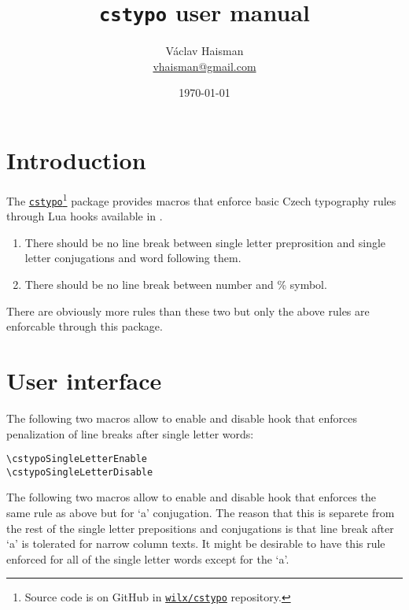 \documentclass[paper=B5,DIV=calc,parskip=half]{scrartcl}
\author{Václav Haisman\texorpdfstring{%
    \\{\small\href{mailto:vhaisman+cstypo@gmail.com?subject=[cstypo]}{vhaisman@gmail.com}}}{}}
\date{\today}
\title{\texttt{cstypo} user manual}
\begin{document}
\begin{titlepage}
  \maketitle  
\end{titlepage}

\tableofcontents

\section{Introduction}
The \href{https://www.ctan.org/pkg/cstypo}{\texttt{cstypo}}\footnote{Source
  code is on GitHub in
  \href{https://github.com/wilx/cstypo}{\texttt{wilx/cstypo}} repository.}
package provides macros that enforce basic Czech typography rules through Lua
hooks available in \LuaTeX{}.

\begin{enumerate}%
\item\label{itm:singleletter} There should be no line break between single
  letter preprosition and single letter conjugations and word following them.
\item\label{itm:percents} There should be no line break between number and \%
  symbol.
\end{enumerate}

There are obviously more rules than these two but only the above rules are
enforcable through this package.

\section{User interface}

The following two macros allow to enable and disable hook that enforces
penalization of line breaks after single letter words:

\begin{lstlisting}[style=myLatexStyle]
\cstypoSingleLetterEnable
\cstypoSingleLetterDisable
\end{lstlisting}

The following two macros allow to enable and disable hook that enforces the
same rule as above but for ‘a’ conjugation. The reason that this is separete
from the rest of the single letter prepositions and conjugations is that line
break after ‘a’ is tolerated for narrow column texts. It might be desirable
to have this rule enforced for all of the single letter words except for the
‘a’.
\end{document}
